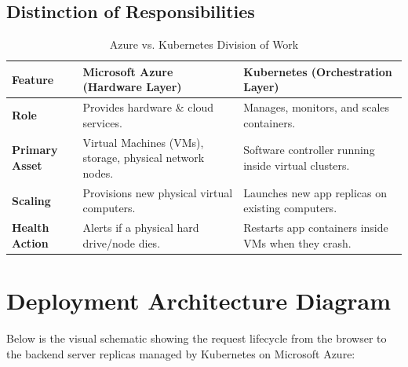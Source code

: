 \documentclass[11pt,a4paper]{article}
\begin{document}
\subsection{Distinction of Responsibilities}
\begin{table}[h]
\centering
\small
\begin{tabular}{lp{6.5cm}p{6.5cm}}
\toprule
\textbf{Feature} & \textbf{Microsoft Azure (Hardware Layer)} & \textbf{Kubernetes (Orchestration Layer)} \\
\midrule
\textbf{Role} & Provides hardware \& cloud services. & Manages, monitors, and scales containers. \\
\textbf{Primary Asset} & Virtual Machines (VMs), storage, physical network nodes. & Software controller running inside virtual clusters. \\
\textbf{Scaling} & Provisions new physical virtual computers. & Launches new app replicas on existing computers. \\
\textbf{Health Action} & Alerts if a physical hard drive/node dies. & Restarts app containers inside VMs when they crash. \\
\bottomrule
\end{tabular}
\caption{Azure vs. Kubernetes Division of Work}
\end{table}

\newpage

\section{Deployment Architecture Diagram}

Below is the visual schematic showing the request lifecycle from the browser to the backend server replicas managed by Kubernetes on Microsoft Azure:

\vspace{0.8cm}
\end{document}
